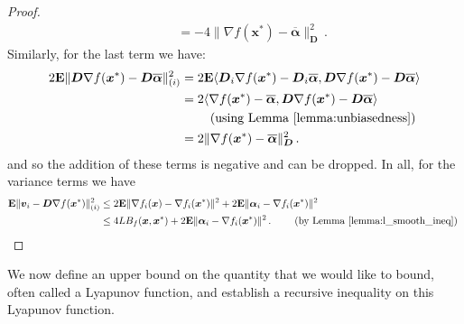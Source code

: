\documentclass{article}
\newcommand{\Econd}{\mathbf{E}}
\def\xx{{\boldsymbol x}}
\def\vv{{\boldsymbol v}}
\def\DD{{\boldsymbol D}}
\begin{document}
\begin{proof}
\begin{align}
  &\qquad= - 4 \|\nabla f(\xx^*) - \overline{{\boldsymbol\alpha}} \|_{\DD}^2 \,.
\end{align}
Similarly, for the last term we have:
\begin{align}
  2 \Econd \|\DD\nabla f(\xx^*) - \DD \overline{{\boldsymbol\alpha}} \|_{(i)}^2  &= 2\Econd \langle \DD_i \nabla f(\xx^*) - \DD_i \overline{{\boldsymbol\alpha}}, \DD \nabla f(\xx^*) - \DD \overline{{\boldsymbol\alpha}} \rangle \nonumber\\
  &= 2 \langle \nabla f(\xx^*) - \overline{{\boldsymbol\alpha}}, \DD \nabla f(\xx^*) - \DD \overline{{\boldsymbol\alpha}} \rangle \nonumber\\
  &\qquad \text{ (using Lemma~\ref{lemma:unbiasedness})}\nonumber\\
  &= 2\|\nabla f(\xx^*) - \overline{{\boldsymbol\alpha}} \|_{\DD}^2 \,.
\end{align}
and so the addition of these terms is negative and can be dropped. In all, for the variance terms we have
\begin{align}
    \Econd \|\vv_i - \DD \nabla f(\xx^*)\|_{(i)}^2 &\leq 2 \Econd \|\nabla f_i(\xx) - \nabla f_i(\xx^*)\|^2 + 2\Econd\|{\boldsymbol\alpha}_i - \nabla f_i(\xx^*) \|^2 \nonumber\\
    &\leq 4 L B_f(\xx, \xx^*) + 2\Econd\|{\boldsymbol\alpha}_i - \nabla f_i(\xx^*) \|^2 \, . \qquad \text{ (by Lemma~\ref{lemma:l_smooth_ineq}) }
\end{align}
\end{proof}

We now define an upper bound on the quantity that we would like to bound, often called a Lyapunov function, and establish a recursive inequality on this Lyapunov function.
\end{document}
